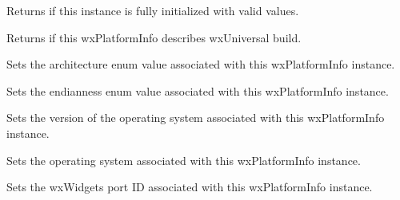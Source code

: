 
Returns \true if this instance is fully initialized with valid values.



\label{wxplatforminfoisusinguniversalwidgets}


Returns \true if this wxPlatformInfo describes wxUniversal build.


\label{wxplatforminfosetarchitecture}


Sets the architecture enum value associated with this wxPlatformInfo instance.



\label{wxplatforminfosetendianness}


Sets the endianness enum value associated with this wxPlatformInfo instance.


\label{wxplatforminfosetosversion}


Sets the version of the operating system associated with this wxPlatformInfo instance.



\label{wxplatforminfosetoperatingsystemid}


Sets the operating system associated with this wxPlatformInfo instance.



\label{wxplatforminfosetportid}


Sets the wxWidgets port ID associated with this wxPlatformInfo instance.



\label{wxplatforminfosettoolkitversion}


